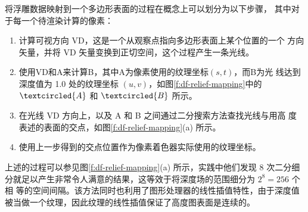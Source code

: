 将浮雕数据映射到一个多边形表面的过程在概念上可以划分为以下步骤， 其中对于每一个待渲染计算的像素：

\begin{enumerate}
	\item 计算可视方向 VD，这是一个从观察点指向多边形表面上某个位置的一个 方向矢量，并将 VD 矢量变换到正切空间，这个过程产生一条光线。
	\item 使用VD和A来计算B，其中A为像素使用的纹理坐标$(s,t)$，而B为光 线达到深度值为 1.0 处的纹理坐标 $(u, v)$，如图\ref{f:df-relief-mapping}中的 $\textcircled{A}$ 和 $\textcircled{B}$ 所示。
	\item 在光线 VD 方向上，以及 A 和 B 之间通过二分搜索方法查找光线与用高 度表述的表面的交点，如图\ref{f:df-relief-mapping}(a) 所示。
	\item 使用上一步得到的交点位置作为像素着色器实际使用的纹理坐标。
\end{enumerate}

上述的过程可以参见图\ref{f:df-relief-mapping}(a) 所示，实践中他们发现 8 次二分细分就足以产生非常令人满意的结果，这等效于将深度场的范围细分为 $2^{8} = 256$ 个相 等的空间间隔。该方法同时也利用了图形处理器的线性插值特性，由于深度值 被当做一个纹理，因此纹理的线性插值保证了高度图表面是连续的。

